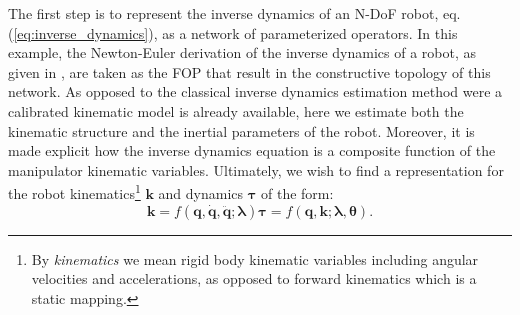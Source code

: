 The first step is to represent the inverse dynamics of an N-DoF robot, eq. (\ref{eq:inverse_dynamics}), as a network of parameterized operators. In this example, the Newton-Euler derivation of the inverse dynamics of a robot, as given in \cite{AnAtkHol1985}, are taken as the FOP that result in the constructive topology of this network. As opposed to the classical inverse dynamics estimation method were a calibrated kinematic model is already available, here we estimate both the kinematic structure and the inertial parameters of the robot. Moreover, it is made explicit how the inverse dynamics equation is a composite function of the manipulator kinematic variables. Ultimately, we wish to find a representation for the robot kinematics\footnote{By \emph{kinematics} we mean rigid body kinematic variables including angular velocities and accelerations, as opposed to forward kinematics which is a static mapping.} $\bm{k}$ and dynamics $\bm{\tau}$ of the form:
\begin{subequations}
\begin{equation}
\bm{k}=f(\boldsymbol{q},\dot{\boldsymbol{q}},\ddot{\bm{q}};\bm{\lambda})
\label{eq:kin_rep}
\end{equation}
\begin{equation}
\bm{\tau}=f(\bm{q},\bm{k};\bm{\lambda},\bm{\theta}).
\label{eq:dyn_rep}
\end{equation}
\end{subequations}

